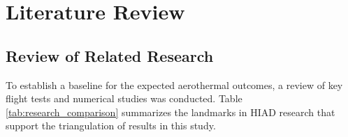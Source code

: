 \chapter{Literature Review}



\section{Review of Related Research}

To establish a baseline for the expected aerothermal outcomes, a review of key flight tests and numerical studies was conducted. Table \ref{tab:research_comparison} summarizes the landmarks in HIAD research that support the triangulation of results in this study.

